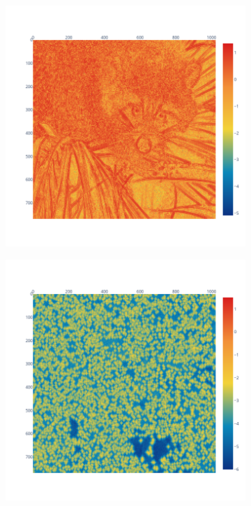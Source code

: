 \documentclass[11pt]{article}
\begin{document}
\begin{figure}
\begin{subfigure}{0.3\linewidth}
    \caption{}
    \label{fig:bspline_input}
    \label{fig:bspline_bisplev_sig}
\end{subfigure}
\begin{subfigure}{0.3\linewidth}
    \includegraphics[width=\linewidth]{figure/bspline/bisplev_ret_mean_log_portland.png}
    \caption{}
    \label{fig:bspline_bisplev_mean}
\end{subfigure}
\begin{subfigure}{0.3\linewidth}
    \includegraphics[width=\linewidth]{figure/bspline/bisplev_ret_std_log_portland.png}

\end{subfigure}
\end{figure}
\end{document}
